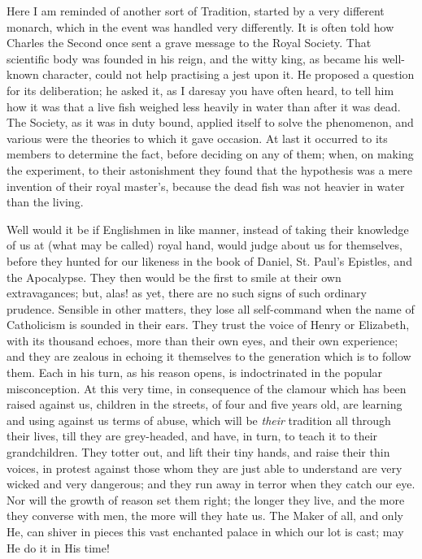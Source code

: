 Here I am reminded of another sort of Tradition,
started by a very different monarch, which in the event
was handled very differently. It is often told how
Charles the Second once sent a grave message to the Royal
Society. That scientific body was founded in his reign,
and the witty king, as became his well-known character,
could not help practising a jest upon it. He proposed a
question for its deliberation; he asked it, as I daresay
you have often heard, to tell him how it was that a live
fish weighed less heavily in water than after it was
dead. The Society, as it was in duty bound, applied
itself to solve the phenomenon, and various were the
theories to which it gave occasion. At last it occurred
to its members to determine the fact, before deciding on
any of them; when, on making the experiment, to their
astonishment they found that the hypothesis was a mere
invention of their royal master's, because the dead fish
was not heavier in water than the living.

Well would it be if Englishmen in like manner, instead
of taking their knowledge of us at (what may be called)
royal hand, would judge about us for themselves, before
they hunted for our likeness in the book of Daniel, St.
Paul's Epistles, and the Apocalypse. They then would be
the first to smile at their own extravagances; but, alas!
as yet, there are no such signs of such ordinary
prudence. Sensible in other matters, they lose all
self-command when the name of Catholicism is sounded in
their ears. They trust the voice of Henry or Elizabeth,
with its thousand echoes, more than their own eyes, and
their own experience; and they are zealous in echoing it
themselves to the generation which is to follow them.
Each in his turn, as his reason opens, is indoctrinated
in the popular misconception. At this very time, in
consequence of the clamour which has been raised against
us, children in the streets, of four and five years old,
are learning and using against us terms of abuse, which
will be \emph{their} tradition all through their lives,
till they are grey-headed, and have, in turn, to teach it
to their grandchildren. They totter out, and lift their
tiny hands, and raise their thin voices, in protest
against those whom they are just able to understand are
very wicked and very dangerous; and they run away in
terror when they catch our eye. Nor will the growth of
reason set them right; the longer they live, and the more
they converse with men, the more will they hate us. The
Maker of all, and only He, can shiver in pieces this vast
enchanted palace in which our lot is cast; may He do it
in His time!

